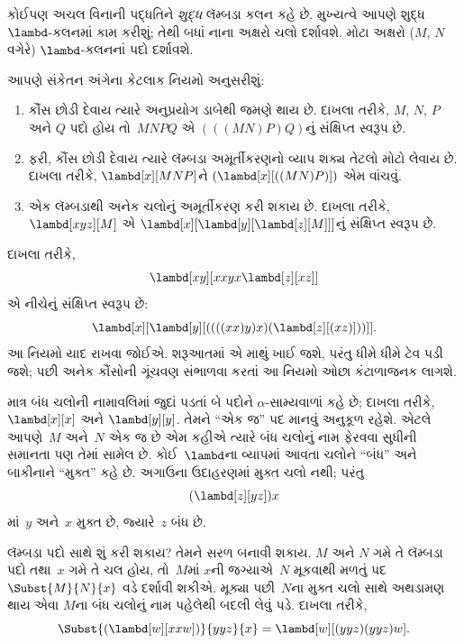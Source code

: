 કોઈપણ અચલ વિનાની પદ્ધતિને \emph{શુદ્ધ} લૅમ્બડા કલન કહે છે.
મુખ્યત્વે આપણે શુદ્ધ~$\lambd$-કલનમાં કામ કરીશું; તેથી બધાં નાના
અક્ષરો ચલો દર્શાવશે. મોટા અક્ષરો ($M$, $N$ વગેરે) $\lambd$-કલનનાં
પદો દર્શાવશે.

આપણે સંકેતન અંગેના કેટલાક નિયમો અનુસરીશું:

\begin{conv}
\begin{enumerate}
\item કૌંસ છોડી દેવાય ત્યારે અનુપ્રયોગ ડાબેથી જમણે થાય છે.
  દાખલા તરીકે, $M$, $N$, $P$ અને $Q$ પદો હોય તો~$MNPQ$ એ
  $(((MN)P)Q)$નું સંક્ષિપ્ત સ્વરૂપ છે.
\item ફરી, કૌંસ છોડી દેવાય ત્યારે લૅમ્બડા અમૂર્તીકરણનો વ્યાપ
  શક્ય તેટલો મોટો લેવાય છે. દાખલા તરીકે, $\lambd[x][MNP]$ને
  $(\lambd[x][((MN)P)])$ એમ વાંચવું.
\item એક લૅમ્બડાથી અનેક ચલોનું અમૂર્તીકરણ કરી શકાય છે.
  દાખલા તરીકે, $\lambd[xyz][M]$ એ
  $\lambd[x][\lambd[y][\lambd[z][M]]]$નું સંક્ષિપ્ત સ્વરૂપ છે.
\end{enumerate}
\end{conv}

દાખલા તરીકે,
\[
\lambd[xy][xxyx \lambd[z][xz]]
\]
એ નીચેનું સંક્ષિપ્ત સ્વરૂપ છે:
\[
\lambd[x][\lambd[y][((((xx)y)x)(\lambd[z][(xz)]))]].
\]
આ નિયમો યાદ રાખવા જોઈએ. શરૂઆતમાં એ માથું ખાઈ જશે, પરંતુ
ધીમે ધીમે ટેવ પડી જશે; પછી અનેક કૌંસોની ગૂંચવણ સંભાળવા કરતાં
આ નિયમો ઓછા કંટાળાજનક લાગશે.

માત્ર બંધ ચલોની નામાવલિમાં જુદાં પડતાં બે પદોને
$\alpha$-સામ્યવાળાં કહે છે; દાખલા તરીકે, $\lambd[x][x]$ અને
$\lambd[y][y]$. તેમને ``એક જ'' પદ માનવું અનુકૂળ રહેશે.
એટલે આપણે~$M$ અને~$N$ એક જ છે એમ કહીએ ત્યારે બંધ ચલોનું નામ
ફેરવવા સુધીની સમાનતા પણ તેમાં સામેલ છે. કોઈ~$\lambd$ના વ્યાપમાં
આવતા ચલોને ``બંધ'' અને બાકીનાને ``મુક્ત'' કહે છે. અગાઉના ઉદાહરણમાં
મુક્ત ચલો નથી; પરંતુ
\[
(\lambd[z][yz])x
\]
માં~$y$ અને~$x$ મુક્ત છે, જ્યારે~$z$ બંધ છે.
\endgroup


\begingroup
\makeatletter{}\makeatother

\label{guunit:OLP-0345}


લૅમ્બડા પદો સાથે શું કરી શકાય? તેમને સરળ બનાવી શકાય.
$M$ અને $N$ ગમે તે લૅમ્બડા પદો તથા~$x$ ગમે તે ચલ હોય, તો~$M$માં
$x$ની જગ્યાએ~$N$ મૂકવાથી મળતું પદ~$\Subst{M}{N}{x}$ વડે
દર્શાવી શકીએ. મૂક્યા પછી~$N$ના મુક્ત ચલો સાથે અથડામણ થાય એવા
$M$ના બંધ ચલોનું નામ પહેલેથી બદલી લેવું પડે. દાખલા તરીકે,
\[
\Subst{(\lambd[w][xxw])}{yyz}{x} = \lambd[w][(yyz)(yyz)w].
\]

